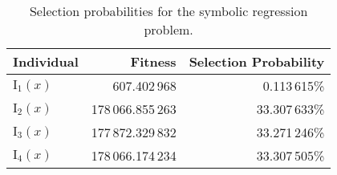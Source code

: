 \begin{table}[ht!]
  \centering
  \begin{tabular}{|l|r|r|}
    \hline
    \textbf{Individual} & \textbf{Fitness} & \textbf{Selection Probability}	\\
    \hline
    $\mathrm{I}_1(x)$ & 607.402\,968 & 0.113\,615\%	\\
    \hline
    $\mathrm{I}_2(x)$ & 178\,066.855\,263 & 33.307\,633\%	\\
    \hline
    $\mathrm{I}_3(x)$ & 177\,872.329\,832 & 33.271\,246\%	\\
    \hline
    $\mathrm{I}_4(x)$ & 178\,066.174\,234 & 33.307\,505\%	\\
    \hline
  \end{tabular}
  \caption{Selection probabilities for the symbolic regression problem.}
  \label{tab:bg:gp:sel:prob}
\end{table}